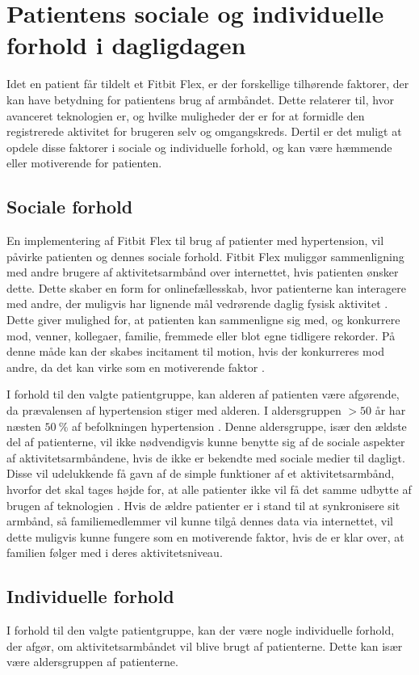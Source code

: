 \section{Patientens sociale og individuelle forhold i dagligdagen}
Idet en patient får tildelt et Fitbit Flex, er der forskellige tilhørende faktorer, der kan have betydning for patientens brug af armbåndet. 
Dette relaterer til, hvor avanceret teknologien er, og hvilke muligheder der er for at formidle den registrerede aktivitet for brugeren selv og omgangskreds. Dertil er det muligt at opdele disse faktorer i sociale og individuelle forhold, og kan være hæmmende eller motiverende for patienten.   

\subsection{Sociale forhold}
En implementering af Fitbit Flex til brug af patienter med hypertension, vil påvirke patienten og dennes sociale forhold. Fitbit Flex muliggør sammenligning med andre brugere af aktivitetsarmbånd over internettet, hvis patienten ønsker dette. Dette skaber en form for onlinefællesskab, hvor patienterne kan interagere med andre, der muligvis har lignende mål vedrørende daglig fysisk aktivitet \citep{karapanos2016}. 
Dette giver mulighed for, at patienten kan sammenligne sig med, og konkurrere mod, venner, kollegaer, familie, fremmede eller blot egne tidligere rekorder. På denne måde kan der skabes incitament til motion, hvis der konkurreres mod andre, da det kan virke som en motiverende faktor \citep{rooksby2014}.

I forhold til den valgte patientgruppe, kan alderen af patienten være afgørende, da prævalensen af hypertension stiger med alderen. I aldersgruppen $>50$ år har næsten $50~\%$ af befolkningen hypertension \citep{kronborg2008}. Denne aldersgruppe, især den ældste del af patienterne, vil ikke nødvendigvis kunne benytte sig af de sociale aspekter af aktivitetsarmbåndene, hvis de ikke er bekendte med sociale medier til dagligt. Disse vil udelukkende få gavn af de simple funktioner af et aktivitetsarmbånd, hvorfor det skal tages højde for, at alle patienter ikke vil få det samme udbytte af brugen af teknologien \citep{mercer2016}. Hvis de ældre patienter er i stand til at synkronisere sit armbånd, så familiemedlemmer vil kunne tilgå dennes data via internettet, vil dette muligvis kunne fungere som en motiverende faktor, hvis de er klar over, at familien følger med i deres aktivitetsniveau.

\subsection{Individuelle forhold}
I forhold til den valgte patientgruppe, kan der være nogle individuelle forhold, der afgør, om aktivitetsarmbåndet vil blive brugt af patienterne. Dette kan især være aldersgruppen af patienterne. 

